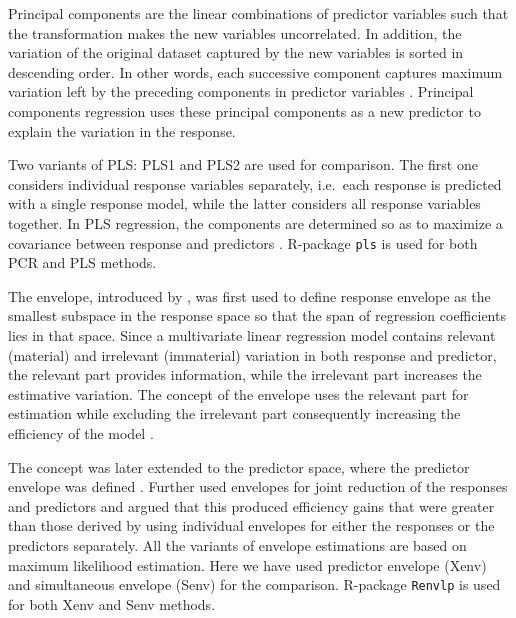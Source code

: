 \documentclass[review]{elsarticle}
\providecommand{\tightlist}{%
  \setlength{\itemsep}{0pt}\setlength{\parskip}{0pt}}
\begin{document}
\begin{description}
\tightlist
\item[\emph{Principal Components Regression (PCR):}]
Principal components are the linear combinations of predictor variables
such that the transformation makes the new variables uncorrelated. In
addition, the variation of the original dataset captured by the new
variables is sorted in descending order. In other words, each successive
component captures maximum variation left by the preceding components in
predictor variables \citep{Jolliffe2002}. Principal components
regression uses these principal components as a new predictor to explain
the variation in the response.
\item[\emph{Partial Least Squares (PLS):}]
Two variants of PLS: PLS1 and PLS2 are used for comparison. The first
one considers individual response variables separately, i.e.~each
response is predicted with a single response model, while the latter
considers all response variables together. In PLS regression, the
components are determined so as to maximize a covariance between
response and predictors \citep{DeJong1993}. R-package \texttt{pls}
\citep{pls2018} is used for both PCR and PLS methods.
\item[\emph{Envelopes:}]
The envelope, introduced by \citet{Cook2007a}, was first used to define
response envelope \citep{cook2010envelope} as the smallest subspace in
the response space so that the span of regression coefficients lies in
that space. Since a multivariate linear regression model contains
relevant (material) and irrelevant (immaterial) variation in both
response and predictor, the relevant part provides information, while
the irrelevant part increases the estimative variation. The concept of
the envelope uses the relevant part for estimation while excluding the
irrelevant part consequently increasing the efficiency of the model
\citep{cook2016algorithms}.

The concept was later extended to the predictor space, where the
predictor envelope was defined \citep{cook2013envelopes}. Further
\citet{cook2015simultaneous} used envelopes for joint reduction of the
responses and predictors and argued that this produced efficiency gains
that were greater than those derived by using individual envelopes for
either the responses or the predictors separately. All the variants of
envelope estimations are based on maximum likelihood estimation. Here we
have used predictor envelope (Xenv) and simultaneous envelope (Senv) for
the comparison. R-package \texttt{Renvlp} \citep{env2018} is used for
both Xenv and Senv methods.
\end{description}
\end{document}
